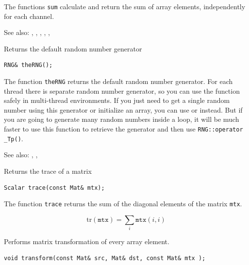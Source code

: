 The functions \texttt{sum} calculate and return the sum of array elements, independently for each channel.

See also: , , , , , 

\label{theRNG}
Returns the default random number generator

\begin{lstlisting}
RNG& theRNG();
\end{lstlisting}

The function \texttt{theRNG} returns the default random number generator. For each thread there is separate random number generator, so you can use the function safely in multi-thread environments. If you just need to get a single random number using this generator or initialize an array, you can use  or  instead. But if you are going to generate many random numbers inside a loop, it will be much faster to use this function to retrieve the generator and then use \texttt{RNG::operator \_Tp()}.

See also: , , 

\label{trace}
Returns the trace of a matrix

\begin{lstlisting}
Scalar trace(const Mat& mtx);
\end{lstlisting}
\begin{description}
\end{description}

The function \texttt{trace} returns the sum of the diagonal elements of the matrix \texttt{mtx}.

\[ \mathrm{tr}(\texttt{mtx}) = \sum_i \texttt{mtx}(i,i) \]


\label{transform}
Performs matrix transformation of every array element.

\begin{lstlisting}
void transform(const Mat& src, Mat& dst, const Mat& mtx );
\end{lstlisting}
\begin{description}
\end{description}


